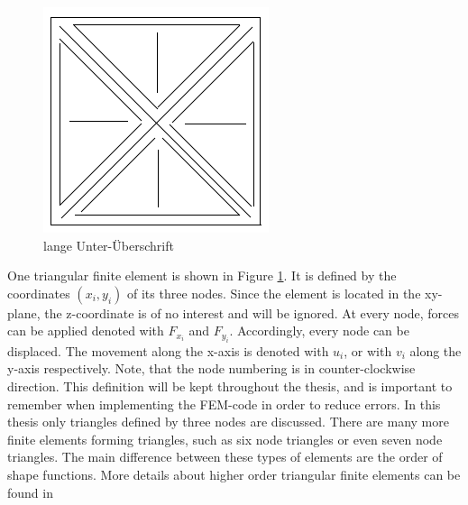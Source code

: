 \documentclass[11pt,twoside]{scrartcl}
\begin{document}
  \begin{figure}
  	\centering
  	\includegraphics[width=0.7\linewidth]{figures/platzhalter}
  	\caption[kurze Unter-Überschrift]{lange Unter-Überschrift}
  	\label{fig:platzhalter}
  \end{figure}
  One triangular finite element is shown in Figure \ref{fig:platzhalter}. It is defined by the coordinates $(x_i,y_i)$ of its three nodes. Since the element is located in the xy-plane, the z-coordinate is of no interest and will be ignored. At every node, forces can be applied denoted with $F_{x_i}$ and $F_{y_i}$. Accordingly, every node can be displaced. The movement along the x-axis is denoted with $u_i$, or with $v_i$ along the y-axis respectively. Note, that the node numbering is in counter-clockwise direction. This definition will be kept throughout the thesis, and is important to remember when implementing the FEM-code in order to reduce errors.
  In this thesis only triangles defined by three nodes are discussed. There are many more finite elements forming triangles, such as six node triangles or even seven node triangles. The main difference between these types of elements are the order of shape functions. More details about higher order triangular finite elements can be found in %
  
\end{document}
